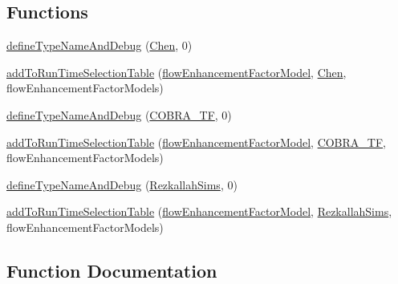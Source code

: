 \subsection*{Functions}
\begin{DoxyCompactItemize}
\item 
\hyperlink{namespaceFoam_1_1flowEnhancementFactorModels_a53edd21a36706b62b2f5fcac91664bd4}{define\+Type\+Name\+And\+Debug} (\hyperlink{classFoam_1_1flowEnhancementFactorModels_1_1Chen}{Chen}, 0)
\item 
\hyperlink{namespaceFoam_1_1flowEnhancementFactorModels_a4a1bd82836666273d8ac30bf4c36f69a}{add\+To\+Run\+Time\+Selection\+Table} (\hyperlink{classFoam_1_1flowEnhancementFactorModel}{flow\+Enhancement\+Factor\+Model}, \hyperlink{classFoam_1_1flowEnhancementFactorModels_1_1Chen}{Chen}, flow\+Enhancement\+Factor\+Models)
\item 
\hyperlink{namespaceFoam_1_1flowEnhancementFactorModels_a1ac26a27af6bf15575abefe36304a1b3}{define\+Type\+Name\+And\+Debug} (\hyperlink{classFoam_1_1flowEnhancementFactorModels_1_1COBRA__TF}{C\+O\+B\+R\+A\+\_\+\+TF}, 0)
\item 
\hyperlink{namespaceFoam_1_1flowEnhancementFactorModels_a6ae0706e320a5747b0de54a81fc974fa}{add\+To\+Run\+Time\+Selection\+Table} (\hyperlink{classFoam_1_1flowEnhancementFactorModel}{flow\+Enhancement\+Factor\+Model}, \hyperlink{classFoam_1_1flowEnhancementFactorModels_1_1COBRA__TF}{C\+O\+B\+R\+A\+\_\+\+TF}, flow\+Enhancement\+Factor\+Models)
\item 
\hyperlink{namespaceFoam_1_1flowEnhancementFactorModels_a636d80a988097343a0ed4c3491ad09b2}{define\+Type\+Name\+And\+Debug} (\hyperlink{classFoam_1_1flowEnhancementFactorModels_1_1RezkallahSims}{Rezkallah\+Sims}, 0)
\item 
\hyperlink{namespaceFoam_1_1flowEnhancementFactorModels_ac611bcabf3e09f06592e67576f4b3828}{add\+To\+Run\+Time\+Selection\+Table} (\hyperlink{classFoam_1_1flowEnhancementFactorModel}{flow\+Enhancement\+Factor\+Model}, \hyperlink{classFoam_1_1flowEnhancementFactorModels_1_1RezkallahSims}{Rezkallah\+Sims}, flow\+Enhancement\+Factor\+Models)
\end{DoxyCompactItemize}


\subsection{Function Documentation}
\mbox{\label{namespaceFoam_1_1flowEnhancementFactorModels_a53edd21a36706b62b2f5fcac91664bd4}} 
